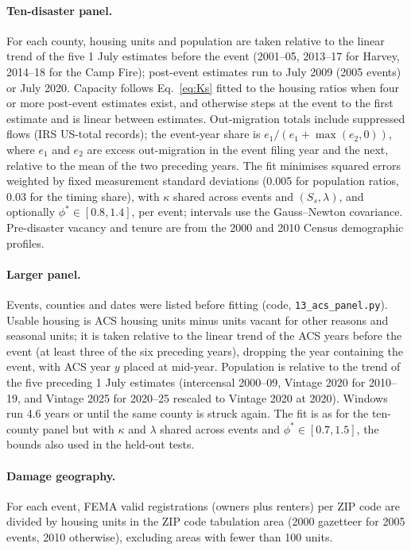 \documentclass[11pt]{article}
\begin{document}
\paragraph{Ten-disaster panel.} For each county, housing units and population are taken relative to the linear trend of the five 1 July estimates before the event (2001--05, 2013--17 for Harvey, 2014--18 for the Camp Fire); post-event estimates run to July 2009 (2005 events) or July 2020. Capacity follows Eq.~\eqref{eq:Ks} fitted to the housing ratios when four or more post-event estimates exist, and otherwise steps at the event to the first estimate and is linear between estimates. Out-migration totals include suppressed flows (IRS US-total records); the event-year share is $e_1/(e_1+\max(e_2,0))$, where $e_1$ and $e_2$ are excess out-migration in the event filing year and the next, relative to the mean of the two preceding years. The fit minimises squared errors weighted by fixed measurement standard deviations (0.005 for population ratios, 0.03 for the timing share), with $\kappa$ shared across events and $(S_s,\lambda)$, and optionally $\phi^*\in[0.8,1.4]$, per event; intervals use the Gauss--Newton covariance. Pre-disaster vacancy and tenure are from the 2000 and 2010 Census demographic profiles.

\paragraph{Larger panel.} Events, counties and dates were listed before fitting (code, \texttt{13\_acs\_panel.py}). Usable housing is ACS housing units minus units vacant for other reasons and seasonal units; it is taken relative to the linear trend of the ACS years before the event (at least three of the six preceding years), dropping the year containing the event, with ACS year $y$ placed at mid-year. Population is relative to the trend of the five preceding 1 July estimates (intercensal 2000--09, Vintage 2020 for 2010--19, and Vintage 2025 for 2020--25 rescaled to Vintage 2020 at 2020). Windows run 4.6 years or until the same county is struck again. The fit is as for the ten-county panel but with $\kappa$ and $\lambda$ shared across events and $\phi^*\in[0.7,1.5]$, the bounds also used in the held-out tests.

\paragraph{Damage geography.} For each event, FEMA valid registrations (owners plus renters) per ZIP code are divided by housing units in the ZIP code tabulation area (2000 gazetteer for 2005 events, 2010 otherwise), excluding areas with fewer than 100 units.
\end{document}
